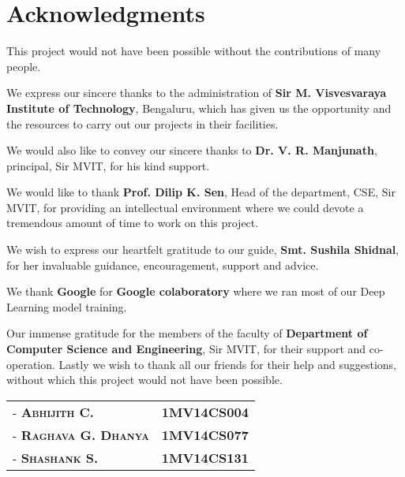 \chapter*{Acknowledgments}
\noindent This project would not have been possible without the contributions of many people.
\par\bigskip
We express our sincere thanks to the administration of \textbf{Sir M. Visvesvaraya Institute of Technology}, Bengaluru, which has given us the opportunity and the resources to carry out our projects in their facilities.
\par\bigskip
We would also like to convey our sincere thanks to \textbf{Dr. V. R. Manjunath}, principal, Sir MVIT, for his kind support.
\par\bigskip
We would like to thank \textbf{Prof. Dilip K. Sen}, Head of the department, CSE, Sir MVIT, for providing an intellectual environment where we could devote a tremendous amount of time to work on this project.
\par\bigskip
We wish to express our heartfelt gratitude to our guide, \textbf{Smt. Sushila Shidnal}, for her invaluable guidance, encouragement, support and advice.
\par\bigskip
We thank \textbf{Google} for \textbf{Google colaboratory} where we ran most of our Deep Learning model training.
\par\bigskip
Our immense gratitude for the members of the faculty of \textbf{Department of Computer Science and Engineering}, Sir MVIT, for their support and co-operation. Lastly we wish to thank all our friends for their help and suggestions, without which this project would not have been possible.\par\bigskip
\vspace{50px}
\noindent\hfill\begin{tabular}{ l r }
        \textsc{-  \textbf{Abhijith C.}}       &  \textbf{1MV14CS004} \\
        \textsc{-  \textbf{Raghava G. Dhanya}} &  \textbf{1MV14CS077} \\
        \textsc{-  \textbf{Shashank S.}}       &  \textbf{1MV14CS131}
\end{tabular}